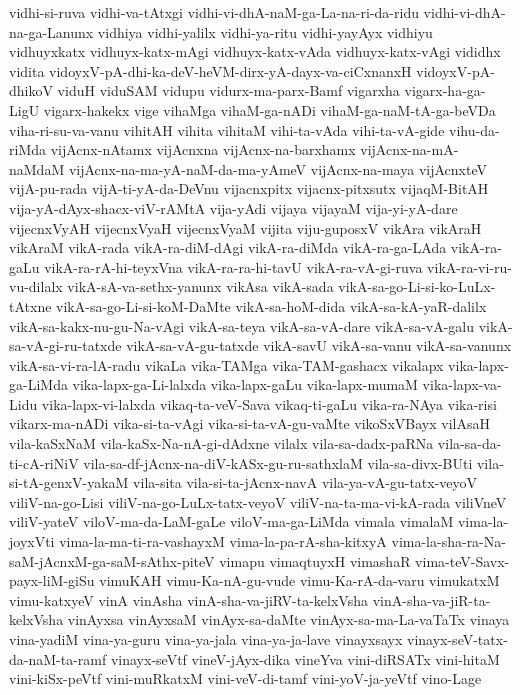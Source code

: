 {vidhi-si-ruva
vidhi-va-tAtxgi
vidhi-vi-dhA-naM-ga-La-na-ri-da-ridu
vidhi-vi-dhA-na-ga-Lanunx
vidhiya
vidhi-yalilx
vidhi-ya-ritu
vidhi-yayAyx
vidhiyu
vidhuyxkatx
vidhuyx-katx-mAgi
vidhuyx-katx-vAda
vidhuyx-katx-vAgi
vididhx
vidita
vidoyxV-pA-dhi-ka-deV-heVM-dirx-yA-dayx-va-ciCxnanxH
vidoyxV-pA-dhikoV
viduH
viduSAM
vidupu
vidurx-ma-parx-Bamf
vigarxha
vigarx-ha-ga-LigU
vigarx-hakekx
vige
vihaMga
vihaM-ga-nADi
vihaM-ga-naM-tA-ga-beVDa
viha-ri-su-va-vanu
vihitAH
vihita
vihitaM
vihi-ta-vAda
vihi-ta-vA-gide
vihu-da-riMda
vijAcnx-nAtamx
vijAcnxna
vijAcnx-na-barxhamx
vijAcnx-na-mA-naMdaM
vijAcnx-na-ma-yA-naM-da-ma-yAmeV
vijAcnx-na-maya
vijAcnxteV
vijA-pu-rada
vijA-ti-yA-da-DeVnu
vijacnxpitx
vijacnx-pitxsutx
vijaqM-BitAH
vija-yA-dAyx-shacx-viV-rAMtA
vija-yAdi
vijaya
vijayaM
vija-yi-yA-dare
vijecnxVyAH
vijecnxVyaH
vijecnxVyaM
vijita
viju-guposxV
vikAra
vikAraH
vikAraM
vikA-rada
vikA-ra-diM-dAgi
vikA-ra-diMda
vikA-ra-ga-LAda
vikA-ra-gaLu
vikA-ra-rA-hi-teyxVna
vikA-ra-ra-hi-tavU
vikA-ra-vA-gi-ruva
vikA-ra-vi-ru-vu-dilalx
vikA-sA-va-sethx-yanunx
vikAsa
vikA-sada
vikA-sa-go-Li-si-ko-LuLx-tAtxne
vikA-sa-go-Li-si-koM-DaMte
vikA-sa-hoM-dida
vikA-sa-kA-yaR-dalilx
vikA-sa-kakx-nu-gu-Na-vAgi
vikA-sa-teya
vikA-sa-vA-dare
vikA-sa-vA-galu
vikA-sa-vA-gi-ru-tatxde
vikA-sa-vA-gu-tatxde
vikA-savU
vikA-sa-vanu
vikA-sa-vanunx
vikA-sa-vi-ra-lA-radu
vikaLa
vika-TAMga
vika-TAM-gashacx
vikalapx
vika-lapx-ga-LiMda
vika-lapx-ga-Li-lalxda
vika-lapx-gaLu
vika-lapx-mumaM
vika-lapx-va-Lidu
vika-lapx-vi-lalxda
vikaq-ta-veV-Sava
vikaq-ti-gaLu
vika-ra-NAya
vika-risi
vikarx-ma-nADi
vika-si-ta-vAgi
vika-si-ta-vA-gu-vaMte
vikoSxVBayx
vilAsaH
vila-kaSxNaM
vila-kaSx-Na-nA-gi-dAdxne
vilalx
vila-sa-dadx-paRNa
vila-sa-da-ti-cA-riNiV
vila-sa-df-jAcnx-na-diV-kASx-gu-ru-sathxlaM
vila-sa-divx-BUti
vila-si-tA-genxV-yakaM
vila-sita
vila-si-ta-jAcnx-navA
vila-ya-vA-gu-tatx-veyoV
viliV-na-go-Lisi
viliV-na-go-LuLx-tatx-veyoV
viliV-na-ta-ma-vi-kA-rada
viliVneV
viliV-yateV
viloV-ma-da-LaM-gaLe
viloV-ma-ga-LiMda
vimala
vimalaM
vima-la-joyxVti
vima-la-ma-ti-ra-vashayxM
vima-la-pa-rA-sha-kitxyA
vima-la-sha-ra-Na-saM-jAcnxM-ga-saM-sAthx-piteV
vimapu
vimaqtuyxH
vimashaR
vima-teV-Savx-payx-liM-giSu
vimuKAH
vimu-Ka-nA-gu-vude
vimu-Ka-rA-da-varu
vimukatxM
vimu-katxyeV
vinA
vinAsha
vinA-sha-va-jiRV-ta-kelxVsha
vinA-sha-va-jiR-ta-kelxVsha
vinAyxsa
vinAyxsaM
vinAyx-sa-daMte
vinAyx-sa-ma-La-vaTaTx
vinaya
vina-yadiM
vina-ya-guru
vina-ya-jala
vina-ya-ja-lave
vinayxsayx
vinayx-seV-tatx-da-naM-ta-ramf
vinayx-seVtf
vineV-jAyx-dika
vineYva
vini-diRSATx
vini-hitaM
vini-kiSx-peVtf
vini-muRkatxM
vini-veV-di-tamf
vini-yoV-ja-yeVtf
vino-Lage
}

